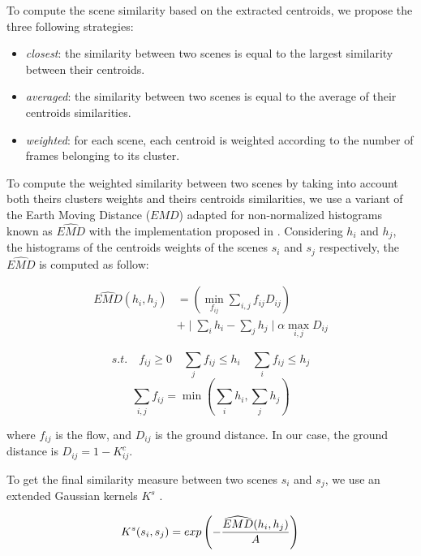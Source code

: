 \documentclass[journal]{IEEEtran}
\begin{document}
To compute the scene similarity based on the extracted centroids, we propose the three following strategies:

\begin{itemize}
\item \emph{closest}: the similarity between two scenes is equal to the largest similarity between their centroids.
\item \emph{averaged}: the similarity between two scenes is equal to the average of their centroids similarities.
\item \emph{weighted}: for each scene, each centroid is weighted according to the number of frames belonging to its cluster. 
\end{itemize}

To compute the  weighted similarity between two scenes by taking into account both theirs clusters weights and theirs centroids similarities, we use a variant of the Earth Moving Distance ($EMD$) adapted for non-normalized histograms known as $\widehat{EMD}$ \cite{pele2008linear} with the implementation proposed in  \cite{pele2009fast}. Considering $h_i$ and $h_j$, the histograms of the centroids weights of the scenes $s_i$ and $s_j$ respectively, the $\widehat{EMD}$ is computed as follow:

\begin{equation}
\begin{split}
\widehat{EMD}(h_i,h_j) &=( \min\limits_{f_{ij}} \sum\limits_{i,j} f_{ij}D_{ij} )  \\ 
&+ \mid \sum\limits_{i} h_i - \sum\limits_{j} h_j  \mid \alpha \max\limits_{i,j} D_{ij}
\end{split}
\end{equation}

\begin{equation*}
s.t. \quad f_{ij}\geq0\quad \sum\limits_{j} f_{ij} \leq h_{i}\quad \sum\limits_{i} f_{ij} \leq h_{j} 
\end{equation*}
\begin{equation*}
\sum\limits_{i,j}f_{ij} = \min( \sum\limits_{i} h_{i} ,\sum\limits_{j} h_{j} )
\end{equation*}

where $f_{ij}$ is the flow, and $D_{ij}$ is the ground distance. In our case, the ground distance is $D_{ij}=1-K^c_{ij}$.

To get the final similarity measure between two scenes $s_i$ and $s_j$, we use an extended Gaussian kernels $K^s$ \cite{chapelle1999support,jing2003support}.

\begin{equation*}
K^s(s_i,s_j) = exp\left( - \dfrac{\widehat{EMD}(h_i,h_j)}{A} \right) \\
\end{equation*}
\end{document}

